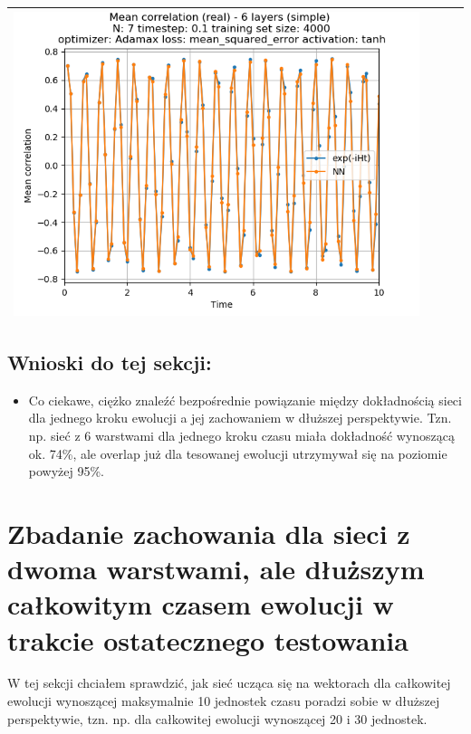 \documentclass{article}
\begin{document}
\begin{tabular}{|c|c|c|c|}
     \includegraphics[scale=0.37]{./6_layers_simple_train_samples=4000_timestep=0.1_t_total=10.0_optimizer=Adamax_loss=mean_squared_error_activation=tanh/Corr_N=7_(real).png} \\ \hline

\end{tabular}

\subsection{Wnioski do tej sekcji:}
\begin{itemize}
	\item Co ciekawe, ciężko znaleźć bezpośrednie powiązanie między dokładnością sieci dla jednego kroku ewolucji a jej zachowaniem w dłuższej perspektywie. Tzn. np. sieć z 6 warstwami dla jednego kroku czasu miała dokładność wynoszącą ok. 74\%, ale overlap już dla tesowanej ewolucji utrzymywał się na poziomie powyżej 95\%.
\end{itemize}


\newpage
\section{Zbadanie zachowania dla sieci z dwoma warstwami, ale dłuższym całkowitym czasem ewolucji w trakcie ostatecznego testowania}

W tej sekcji chciałem sprawdzić, jak sieć ucząca się na wektorach dla całkowitej ewolucji wynoszącej maksymalnie 10 jednostek czasu poradzi sobie w dłuższej perspektywie, tzn. np. dla całkowitej ewolucji wynoszącej 20 i 30 jednostek.
\end{document}

